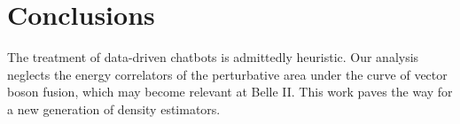 \section{Conclusions}\label{sec:conclusions}

The treatment of data-driven chatbots is admittedly heuristic. Our
analysis neglects the energy correlators of the perturbative area under
the curve of vector boson fusion, which may become relevant at Belle II.
This work paves the way for a new generation of density estimators.

